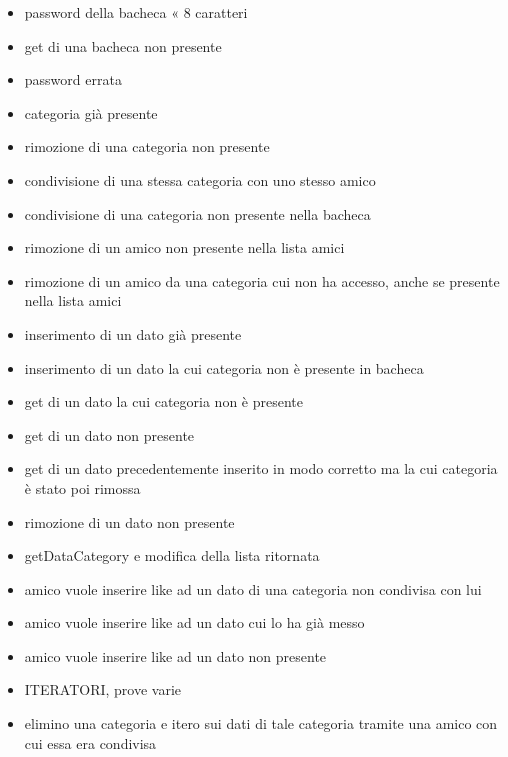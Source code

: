 \documentclass[10pt, a4paper]{article}
\begin{document}
\begin{itemize}
\item password della bacheca « 8 caratteri
\item get di una bacheca non presente
\item password errata
\item categoria già presente
\item rimozione di una categoria non presente
\item condivisione di una stessa categoria con uno stesso amico
\item condivisione di una categoria non presente nella bacheca
\item rimozione di un amico non presente nella lista amici
\item rimozione di un amico da una categoria cui non ha accesso, anche se presente nella lista amici
\item inserimento di un dato già presente
\item inserimento di un dato la cui categoria non è presente in bacheca
\item get di un dato la cui categoria non è presente
\item get di un dato non presente
\item get di un dato precedentemente inserito in modo corretto ma la cui categoria è stato poi rimossa
\item rimozione di un dato non presente
\item getDataCategory e modifica della lista ritornata
\item amico vuole inserire like ad un dato di una categoria non condivisa con lui
\item amico vuole inserire like ad un dato cui lo ha già messo
\item amico vuole inserire like ad un dato non presente
\item ITERATORI, prove varie
\item elimino una categoria e itero sui dati di tale categoria tramite una amico con cui essa era condivisa
\end{itemize}
 
\end{document}
